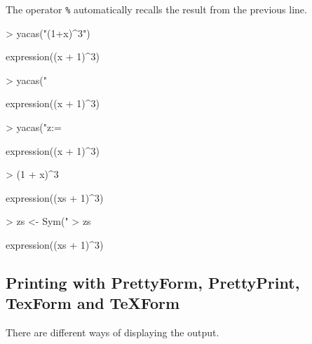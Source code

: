 \documentclass[]{article}
\begin{document}
The operator \texttt{\%} automatically recalls the result from the
previous line. 
\begin{Schunk}
\begin{Sinput}
> yacas("(1+x)^3")
\end{Sinput}
\begin{Soutput}
expression((x + 1)^3)
\end{Soutput}
\begin{Sinput}
> yacas("%")
\end{Sinput}
\begin{Soutput}
expression((x + 1)^3)
\end{Soutput}
\begin{Sinput}
> yacas("z:= %")
\end{Sinput}
\begin{Soutput}
expression((x + 1)^3)
\end{Soutput}
\end{Schunk}

\begin{Schunk}
\begin{Sinput}
> (1 + x)^3
\end{Sinput}
\begin{Soutput}
expression((xs + 1)^3)
\end{Soutput}
\begin{Sinput}
> zs <- Sym("%")
> zs
\end{Sinput}
\begin{Soutput}
expression((xs + 1)^3)
\end{Soutput}
\end{Schunk}



\subsection{Printing with PrettyForm, PrettyPrint, TexForm and  TeXForm} 
\label{sec:printing}

There are different ways of displaying the output. 
\end{document}
